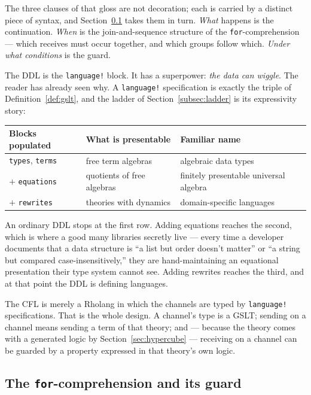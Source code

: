 \documentclass[11pt]{article}
\theoremstyle{definition}
\theoremstyle{plain}
\theoremstyle{remark}
\begin{document}
The three clauses of that gloss are not decoration; each is carried by a distinct piece of
syntax, and Section~\ref{subsec:where} takes them in turn. \emph{What} happens is the
continuation. \emph{When} is the join-and-sequence structure of the
\texttt{for}-comprehension --- which receives must occur together, and which groups
follow which. \emph{Under what conditions} is the guard.

The DDL is the \texttt{language!} block. It has a superpower: \emph{the data can wiggle}.
The reader has already seen why. A \texttt{language!} specification is exactly the triple
of Definition~\ref{def:gslt}, and the ladder of Section~\ref{subsec:ladder} is its
expressivity story:

\begin{center}
\begin{tabular}{@{}lll@{}}
\toprule
\textbf{Blocks populated} & \textbf{What is presentable} & \textbf{Familiar name} \\
\midrule
\texttt{types}, \texttt{terms} & free term algebras & algebraic data types \\
$+$ \texttt{equations} & quotients of free algebras & finitely presentable universal algebra \\
$+$ \texttt{rewrites} & theories with dynamics & domain-specific languages \\
\bottomrule
\end{tabular}
\end{center}

An ordinary DDL stops at the first row. Adding equations reaches the second, which is
where a good many libraries secretly live --- every time a developer documents that a
data structure is ``a list but order doesn't matter'' or ``a string but compared
case-insensitively,'' they are hand-maintaining an equational presentation their type
system cannot see. Adding rewrites reaches the third, and at that point the DDL is
defining languages.

The CFL is merely a Rholang in which the channels are typed by \texttt{language!}
specifications. That is the whole design. A channel's type is a GSLT; sending on a channel
means sending a term of that theory; and --- because the theory comes with a generated
logic by Section~\ref{sec:hypercube} --- receiving on a channel can be guarded by a
property expressed in that theory's own logic.

\subsection{The \texttt{for}-comprehension and its guard}
\label{subsec:where}
\end{document}
